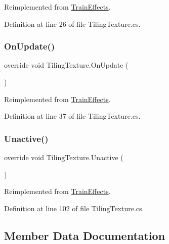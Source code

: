 Reimplemented from \mbox{\hyperlink{class_train_effects_acabdc668bc9a6cf6d8d9e06fa5ccb071}{Train\+Effects}}.



Definition at line 26 of file Tiling\+Texture.\+cs.

\mbox{\label{class_tiling_texture_af38d77dd9f6f05e650c74f246a22556d}} 
\subsubsection{\texorpdfstring{On\+Update()}{OnUpdate()}}
{\footnotesize\ttfamily override void Tiling\+Texture.\+On\+Update (\begin{DoxyParamCaption}{ }\end{DoxyParamCaption})\hspace{0.3cm}{\ttfamily [virtual]}}



Reimplemented from \mbox{\hyperlink{class_train_effects_a245e2891464a93bda2d8f80c1fb53e2c}{Train\+Effects}}.



Definition at line 37 of file Tiling\+Texture.\+cs.

\mbox{\label{class_tiling_texture_adf5b4300ae77f9a1602318da7a0ccc96}} 
\subsubsection{\texorpdfstring{Unactive()}{Unactive()}}
{\footnotesize\ttfamily override void Tiling\+Texture.\+Unactive (\begin{DoxyParamCaption}{ }\end{DoxyParamCaption})\hspace{0.3cm}{\ttfamily [virtual]}}



Reimplemented from \mbox{\hyperlink{class_train_effects_a126011673013f79d482f135be84afc96}{Train\+Effects}}.



Definition at line 102 of file Tiling\+Texture.\+cs.



\subsection{Member Data Documentation}
\mbox{\label{class_tiling_texture_ab58de252e70556f46570b86c7783a720}} 
